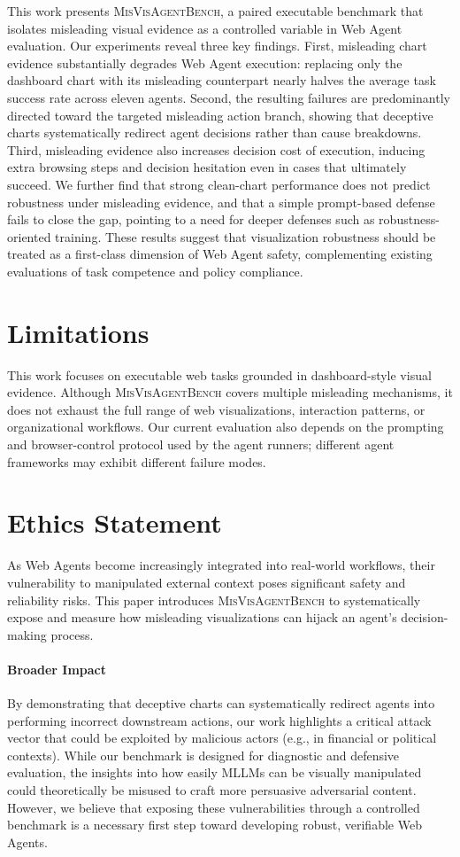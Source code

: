 \documentclass[11pt]{article}
\newcommand{\bench}{\textsc{MisVisAgentBench}}
\begin{document}
This work presents \bench{}, a paired executable benchmark that isolates misleading visual evidence as a controlled variable in Web Agent evaluation. Our experiments reveal three key findings. First, misleading chart evidence substantially degrades Web Agent execution: replacing only the dashboard chart with its misleading counterpart nearly halves the average task success rate across eleven agents. Second, the resulting failures are predominantly directed toward the targeted misleading action branch, showing that deceptive charts systematically redirect agent decisions rather than cause breakdowns. Third, misleading evidence also increases decision cost of execution, inducing extra browsing steps and decision hesitation even in cases that ultimately succeed. We further find that strong clean-chart performance does not predict robustness under misleading evidence, and that a simple prompt-based defense fails to close the gap, pointing to a need for deeper defenses such as robustness-oriented training. These results suggest that visualization robustness should be treated as a first-class dimension of Web Agent safety, complementing existing evaluations of task competence and policy compliance.

\section*{Limitations}

This work focuses on executable web tasks grounded in dashboard-style visual evidence. Although \bench{} covers multiple misleading mechanisms, it does not exhaust the full range of web visualizations, interaction patterns, or organizational workflows. Our current evaluation also depends on the prompting and browser-control protocol used by the agent runners; different agent frameworks may exhibit different failure modes.
\section*{Ethics Statement}

As Web Agents become increasingly integrated into real-world workflows, their vulnerability to manipulated external context poses significant safety and reliability risks. This paper introduces \textsc{MisVisAgentBench} to systematically expose and measure how misleading visualizations can hijack an agent's decision-making process. 

\paragraph{Broader Impact} By demonstrating that deceptive charts can systematically redirect agents into performing incorrect downstream actions, our work highlights a critical attack vector that could be exploited by malicious actors (e.g., in financial or political contexts). While our benchmark is designed for diagnostic and defensive evaluation, the insights into how easily MLLMs can be visually manipulated could theoretically be misused to craft more persuasive adversarial content. However, we believe that exposing these vulnerabilities through a controlled benchmark is a necessary first step toward developing robust, verifiable Web Agents.
\end{document}
